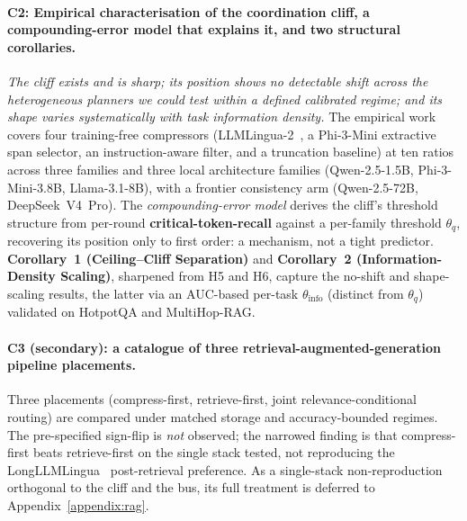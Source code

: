 \paragraph{C2: Empirical characterisation of the coordination
cliff, a compounding-error model that explains it, and two
structural corollaries.}
\emph{The cliff exists and is sharp; its position shows no
detectable shift across the heterogeneous planners we could test
within a defined calibrated regime; and its shape varies
systematically with task information density.} The empirical work
covers four training-free compressors (LLMLingua-2~\cite{pan2024llmlingua2},
a Phi-3-Mini extractive span selector, an instruction-aware filter,
and a truncation baseline) at ten ratios across three families and
three local architecture families (Qwen-2.5-1.5B, Phi-3-Mini-3.8B,
Llama-3.1-8B), with a frontier consistency arm (Qwen-2.5-72B, DeepSeek~V4~Pro). The
\emph{compounding-error model} derives the cliff's threshold
structure from per-round \textbf{critical-token-recall} against a
per-family threshold $\theta_q$, recovering its position only to
first order: a mechanism, not a tight predictor.
\textbf{Corollary~1 (Ceiling--Cliff Separation)} and
\textbf{Corollary~2 (Information-Density Scaling)}, sharpened from
H5 and H6, capture the no-shift and shape-scaling results, the
latter via an AUC-based per-task $\theta_\text{info}$ (distinct from
$\theta_q$) validated on HotpotQA and MultiHop-RAG.

\paragraph{C3 (secondary): a catalogue of three
retrieval-augmented-generation pipeline placements.}
Three placements (compress-first, retrieve-first, joint
relevance-conditional routing) are compared under matched storage
and accuracy-bounded regimes. The pre-specified sign-flip is
\emph{not} observed; the narrowed finding is that compress-first
beats retrieve-first on the single stack tested, not reproducing the
LongLLMLingua~\cite{jiang2024longllmlingua} post-retrieval
preference. As a single-stack non-reproduction orthogonal to the
cliff and the bus, its full treatment is deferred to
Appendix~\ref{appendix:rag}.

